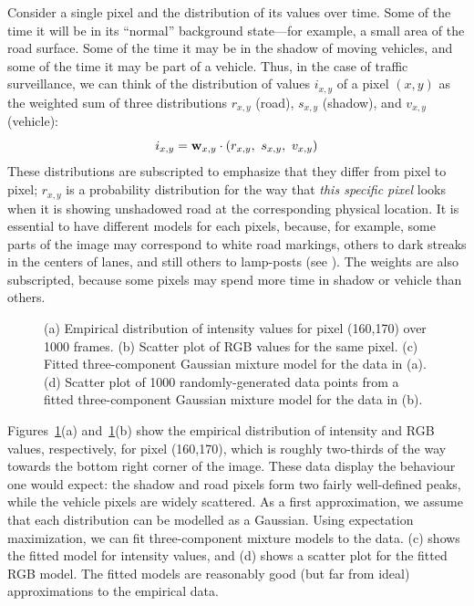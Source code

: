 Consider a single pixel and the distribution of its values over time.
Some of the time it will be in its ``normal'' background state---for
example, a small area of the road surface. Some of the time it may be
in the shadow of moving vehicles, and some of the time it may be part
of a vehicle. Thus, in the case of traffic surveillance, we can think
of the distribution of values $i_{x,y}$ of a pixel $(x,y)$ as the
weighted sum of three distributions $r_{x,y}$ (road), $s_{x,y}$
(shadow), and $v_{x,y}$ (vehicle):
\[ i_{x,y} = \mbox{{\bf w}}_{x,y} \cdot (r_{x,y},\ s_{x,y},\ v_{x,y}) \]
These distributions are subscripted
to emphasize that they differ from pixel to pixel; $r_{x,y}$ is a
probability distribution for the way that {\em this specific pixel}
looks when it is showing unshadowed road at the corresponding physical
location. It is essential to have different models for each pixels,
because, for example, some parts of the image may correspond to white road
markings, others to dark streaks in the centers of lanes, and still
others to lamp-posts (see ).
The weights are also subscripted, because some pixels
may spend more time in shadow or vehicle than others.

\begin{figure}[t]
\caption{(a) Empirical distribution of intensity values for pixel (160,170)
over 1000 frames. (b) Scatter plot of RGB values for the same pixel.
(c) Fitted three-component Gaussian mixture model for the data in (a).
(d) Scatter plot of 1000 randomly-generated data points from a fitted
three-component Gaussian mixture model for the data in (b).}
\label{pixel-model-figure}
\end{figure}

Figures~\ref{pixel-model-figure}(a) and~\ref{pixel-model-figure}(b)
show the empirical distribution of intensity and RGB values,
respectively, for pixel (160,170), which is roughly two-thirds of the
way towards the bottom right corner of the image.  These data display
the behaviour one would expect: the shadow and road pixels form two
fairly well-defined peaks, while the vehicle pixels are widely
scattered.  As a first approximation, we assume that each distribution
can be modelled as a Gaussian.  Using expectation maximization, we can fit three-component mixture models to the
data. (c) shows the fitted model for
intensity values, and (d) shows a scatter
plot for the fitted RGB model. The fitted models are reasonably good
(but far from ideal) approximations to the empirical data.

